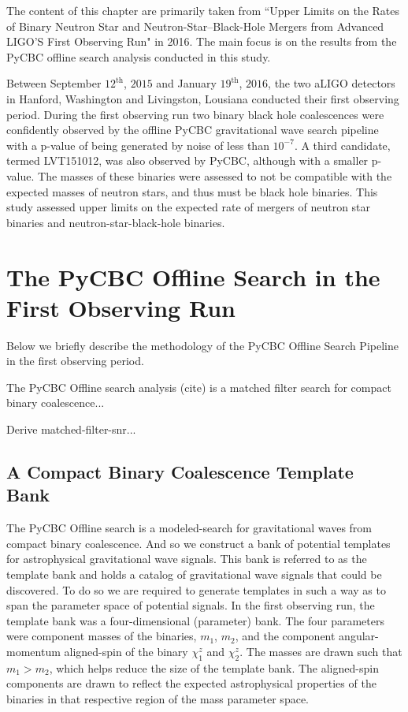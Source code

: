 The content of this chapter are primarily taken from ``Upper Limits on the Rates of Binary Neutron Star and Neutron-Star–Black-Hole Mergers from Advanced LIGO’S First Observing Run" in 2016. The main focus is on the results from the PyCBC offline search analysis conducted in this study.

Between September $12^\mathrm{th}$, $2015$ and January $19^\mathrm{th}$, $2016$, the two aLIGO detectors in Hanford, Washington and Livingston, Lousiana conducted their first observing period. During the first observing run two binary black hole coalescences were confidently observed by the offline PyCBC gravitational wave search pipeline with a p-value of being generated by noise of less than $10^{-7}$. A third candidate, termed LVT151012, was also observed by PyCBC, although with a smaller p-value. The masses of these binaries were assessed to not be compatible with the expected masses of neutron stars, and thus must be black hole binaries. This study assessed upper limits on the expected rate of mergers of neutron star binaries and neutron-star-black-hole binaries.

\section{The PyCBC Offline Search in the First Observing Run}
Below we briefly describe the methodology of the PyCBC Offline Search Pipeline in the first observing period.

The PyCBC Offline search analysis (cite) is a matched filter search for compact binary coalescence...

Derive matched-filter-snr...

\subsection{A Compact Binary Coalescence Template Bank}

The PyCBC Offline search is a modeled-search for gravitational waves from compact binary coalescence. And so we construct a bank of potential templates for astrophysical gravitational wave signals. This bank is referred to as the template bank and holds a catalog of gravitational wave signals that could be discovered. To do so we are required to generate templates in such a way as to span the parameter space of potential signals. In the first observing run, the template bank was a four-dimensional (parameter) bank. The four parameters were component masses of the binaries, $m_1$, $m_2$, and the component angular-momentum aligned-spin of the binary $\chi^z_1$ and $\chi^z_2$. The masses are drawn such that $m_1 > m_2$, which helps reduce the size of the template bank. The aligned-spin components are drawn to reflect the expected astrophysical properties of the binaries in that respective region of the mass parameter space.

